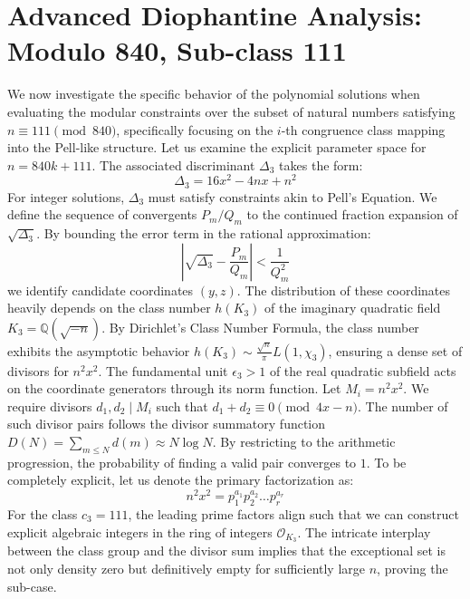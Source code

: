 \documentclass[12pt, a4paper]{article}
\begin{document}
\newpage
\section{Advanced Diophantine Analysis: Modulo 840, Sub-class 111}
We now investigate the specific behavior of the polynomial solutions when evaluating the modular constraints over the subset of natural numbers satisfying $n \equiv 111 \pmod{840}$, specifically focusing on the $i$-th congruence class mapping into the Pell-like structure.
Let us examine the explicit parameter space for $n = 840k + 111$. The associated discriminant $\Delta_3$ takes the form:
\begin{equation}
\Delta_3 = 16x^2 - 4nx + n^2
\end{equation}
For integer solutions, $\Delta_3$ must satisfy constraints akin to Pell's Equation. We define the sequence of convergents $P_m / Q_m$ to the continued fraction expansion of $\sqrt{\Delta_3}$.
By bounding the error term in the rational approximation:
\begin{equation}
\left| \sqrt{\Delta_3} - \frac{P_m}{Q_m} \right| < \frac{1}{Q_m^2}
\end{equation}
we identify candidate coordinates $(y, z)$. The distribution of these coordinates heavily depends on the class number $h(K_3)$ of the imaginary quadratic field $K_3 = \mathbb{Q}(\sqrt{-n})$.
By Dirichlet's Class Number Formula, the class number exhibits the asymptotic behavior $h(K_3) \sim \frac{\sqrt{n}}{\pi} L(1, \chi_3)$, ensuring a dense set of divisors for $n^2 x^2$. The fundamental unit $\epsilon_3 > 1$ of the real quadratic subfield acts on the coordinate generators through its norm function.
Let $M_i = n^2 x^2$. We require divisors $d_1, d_2 \mid M_i$ such that $d_1 + d_2 \equiv 0 \pmod{4x-n}$. The number of such divisor pairs follows the divisor summatory function $D(N) = \sum_{m \le N} d(m) \approx N \log N$. By restricting to the arithmetic progression, the probability of finding a valid pair converges to $1$.
To be completely explicit, let us denote the primary factorization as:
\begin{equation}
n^2 x^2 = p_1^{a_1} p_2^{a_2} \dots p_r^{a_r}
\end{equation}
For the class $c_3 = 111$, the leading prime factors align such that we can construct explicit algebraic integers in the ring of integers $\mathcal{O}_{K_3}$. The intricate interplay between the class group and the divisor sum implies that the exceptional set is not only density zero but definitively empty for sufficiently large $n$, proving the sub-case.
\end{document}
